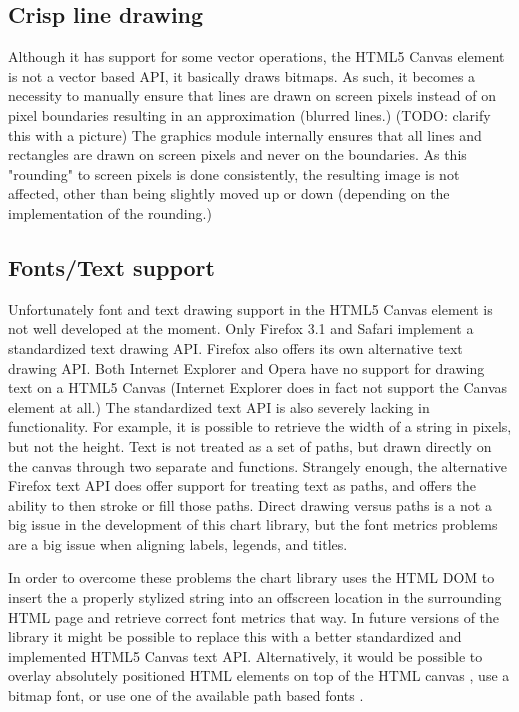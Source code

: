 \subsection{Crisp line drawing}
Although it has support for some vector operations, the HTML5 Canvas element is not a vector based API, it basically draws bitmaps. As such, it becomes a necessity to manually ensure that lines are drawn on screen pixels instead of on pixel boundaries resulting in an approximation (blurred lines.)\cite{shepherd08} (TODO: clarify this with a picture) The graphics module internally ensures that all lines and rectangles are drawn on screen pixels and never on the boundaries. As this "rounding" to screen pixels is done consistently, the resulting image is not affected, other than being slightly moved up or down (depending on the implementation of the rounding.)

\subsection{Fonts/Text support}
Unfortunately font and text drawing support in the HTML5 Canvas element is not well developed at the moment. Only Firefox 3.1 and Safari implement a standardized text drawing API. Firefox also offers its own alternative text drawing API. Both Internet Explorer and Opera have no support for drawing text on a HTML5 Canvas (Internet Explorer does in fact not support the Canvas element at all.) The standardized text API is also severely lacking in functionality. For example, it is possible to retrieve the width of a string in pixels, but not the height. Text is not treated as a set of paths, but drawn directly on the canvas through two separate  and  functions. Strangely enough, the alternative Firefox text API does offer support for treating text as paths, and offers the ability to then stroke or fill those paths. Direct drawing versus paths is a not a big issue in the development of this chart library, but the font metrics problems are a big issue when aligning labels, legends, and titles.

In order to overcome these problems the chart library uses the HTML DOM to insert the a properly stylized string into an offscreen location in the surrounding HTML page and retrieve correct font metrics that way. In future versions of the library it might be possible to replace this with a better standardized and implemented HTML5 Canvas text API. Alternatively, it would be possible to overlay absolutely positioned HTML elements on top of the HTML canvas \cite{steele06}, use a bitmap font, or use one of the available path based fonts \cite{studt07, effenberger08, greenpoint08}.

